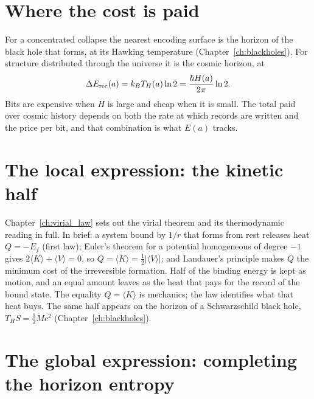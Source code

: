 \section{Where the cost is paid}
For a concentrated collapse the nearest encoding surface is the horizon of the black hole that forms, at its Hawking temperature
(Chapter~\ref{ch:blackholes}). For structure distributed through the universe it is the cosmic horizon, at
\begin{equation}
\Delta E_{\rm rec}(a)=k_BT_H(a)\ln2=\frac{\hbar H(a)}{2\pi}\ln2 . \label{eq:epochcost}
\end{equation}
Bits are expensive when $H$ is large and cheap when it is small. The total paid over cosmic history depends on both the rate at which records are written and
the price per bit, and that combination is what $E(a)$ tracks.

\section{The local expression: the kinetic half}
Chapter~\ref{ch:virial_law} sets out the virial theorem and its thermodynamic reading in full. In brief: a system bound by $1/r$ that forms from rest
releases heat $Q=-E_f$ (first law); Euler's theorem for a potential homogeneous of degree $-1$ gives $2\langle K\rangle+\langle V\rangle=0$, so
$Q=\langle K\rangle=\tfrac12|\langle V\rangle|$; and Landauer's principle makes $Q$ the minimum cost of the irreversible formation. Half of the binding energy
is kept as motion, and an equal amount leaves as the heat that pays for the record of the bound state. The equality $Q=\langle K\rangle$ is mechanics; the
law identifies what that heat buys. The same half appears on the horizon of a Schwarzschild black hole, $T_HS=\tfrac12Mc^2$ (Chapter~\ref{ch:blackholes}).

\section{The global expression: completing the horizon entropy}
